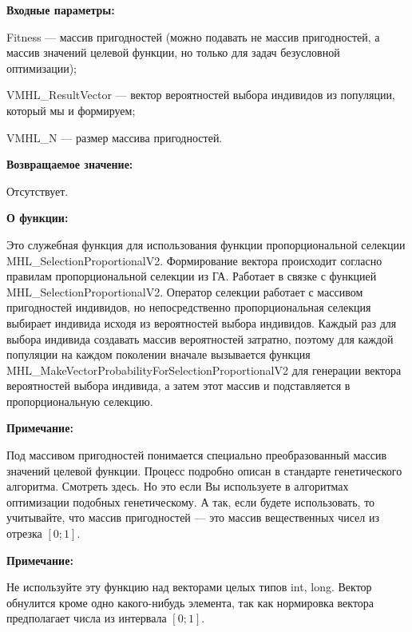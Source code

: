 \textbf{Входные параметры:}
 
Fitness --- массив пригодностей (можно подавать не массив пригодностей, а массив значений целевой функции, но только для задач безусловной оптимизации);
 
VMHL\_ResultVector --- вектор вероятностей выбора индивидов из популяции, который мы и формируем;
 
VMHL\_N --- размер массива пригодностей.

\textbf{Возвращаемое значение:} 

Отсутствует.

\textbf{О функции:}

 Это служебная функция для использования функции пропорциональной селекции MHL\_SelectionProportionalV2.
Формирование вектора происходит согласно правилам пропорциональной селекции из ГА.
Работает в связке с функцией MHL\_SelectionProportionalV2. Оператор селекции работает с массивом пригодностей индивидов, но непосредственно пропорциональная селекция выбирает индивида исходя из вероятностей выбора индивидов. Каждый раз для выбора индивида создавать массив вероятностей затратно, поэтому для каждой популяции на каждом поколении вначале вызывается функция MHL\_MakeVectorProbabilityForSelectionProportionalV2 для генерации вектора вероятностей выбора индивида, а затем этот массив и подставляется в пропорциональную селекцию.

\textbf{Примечание:}

 Под массивом пригодностей понимается специально преобразованный массив значений целевой функции. Процесс подробно описан в стандарте генетического алгоритма. Смотреть здесь. Но это если Вы используете в алгоритмах оптимизации подобных генетическому. А так, если будете использовать, то учитывайте, что массив пригодностей --- это массив вещественных чисел из отрезка $[0;1]$.
 
 \textbf{Примечание:} 

Не используйте эту функцию над векторами целых типов int, long. Вектор обнулится кроме одно какого-нибудь элемента, так как нормировка вектора предполагает числа из интервала $[0;1]$.